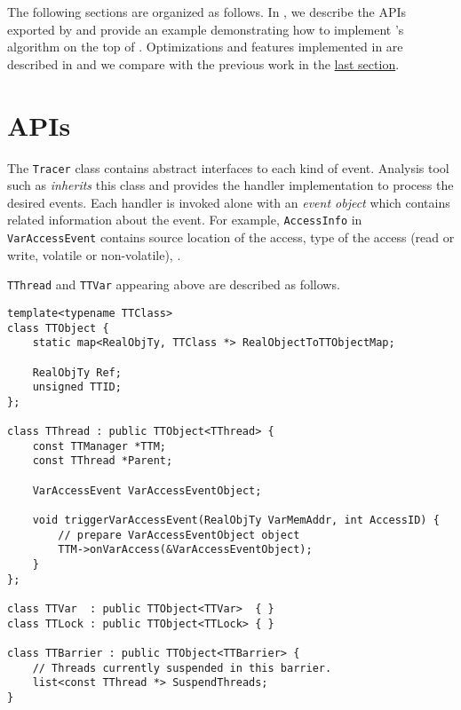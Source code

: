 The following sections are organized as follows. In , we describe the APIs exported by \ThreadTracer{} and provide an example demonstrating how to implement \Eraser{}'s \Lockset{} algorithm on the top of \ThreadTracer{}. Optimizations and features implemented in \ThreadTracer{} are described in  and we compare \ThreadTracer{} with the previous work \RoadRunner{} in the \hyperref[s:ThreadTracer-Comparison]{last section}.

\section{\ThreadTracer{} APIs}
\label{s:ThreadTracer-APIs}


The \verb|Tracer| class contains abstract interfaces to each kind of event. Analysis tool such as \Eraser{} \textit{inherits} this class and provides the handler implementation to process the desired events. Each handler is invoked alone with an \textit{event object} which contains related information about the event. For example, \verb|AccessInfo| in \verb|VarAccessEvent| contains source location of the access, type of the access (read or write, volatile or non-volatile), \etc{}.

\verb|TThread| and \verb|TTVar| appearing above are described as follows.

\begin{lstlisting}[caption={\texttt{TThread}, \texttt{TTVar}, \texttt{TTLock} and \texttt{TTBarrier} class}]
template<typename TTClass>
class TTObject {
	static map<RealObjTy, TTClass *> RealObjectToTTObjectMap;
	
	RealObjTy Ref;
	unsigned TTID;
};

class TThread : public TTObject<TThread> {
	const TTManager *TTM;
	const TThread *Parent;
	
	VarAccessEvent VarAccessEventObject;
	
	void triggerVarAccessEvent(RealObjTy VarMemAddr, int AccessID) {
		// prepare VarAccessEventObject object
		TTM->onVarAccess(&VarAccessEventObject);
	}
};

class TTVar  : public TTObject<TTVar>  { }
class TTLock : public TTObject<TTLock> { }

class TTBarrier : public TTObject<TTBarrier> { 
	// Threads currently suspended in this barrier.
	list<const TThread *> SuspendThreads;
}
\end{lstlisting}


